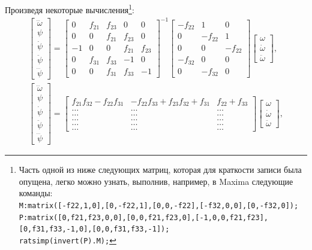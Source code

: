 \documentclass[12pt,a4paper,openany]{extarticle}
\begin{document}
Произведя некоторые вычисления\footnote{Часть одной из ниже следующих матриц, которая для краткости записи была опущена, легко можно узнать, выполнив, например, в Maxima следующие команды:\\
\texttt{M:matrix([-f22,1,0],[0,-f22,1],[0,0,-f22],[-f32,0,0],[0,-f32,0]);}\\
\texttt{P:matrix([0,f21,f23,0,0],[0,0,f21,f23,0],[-1,0,0,f21,f23],[0,f31,f33,-1,0],[0,0,f31,f33,-1]);}\\
\texttt{ratsimp(invert(P).M);}}:
\begin{gather}
\begin{bmatrix}
\dddot\omega \\ \psi \\ \dot\psi \\ \ddot\psi \\ \dddot\psi
\end{bmatrix}
=
\begin{bmatrix}
0  & f_{21} & f_{23} & 0      & 0\\
0  & 0      & f_{21} & f_{23} & 0\\
-1 & 0      & 0      & f_{21} & f_{23}\\
0  & f_{31} & f_{33} & -1     & 0\\
0  & 0      & f_{31} & f_{33} & -1
\end{bmatrix}^{-1}
\begin{bmatrix}
-f_{22} & 1       & 0\\
0       & -f_{22} & 1\\
0       & 0       & -f_{22}\\
-f_{32} & 0       & 0\\
0       & -f_{32} & 0
\end{bmatrix}
\begin{bmatrix}
\omega \\ \dot\omega \\ \ddot\omega
\end{bmatrix}\!\!,\\
%
\begin{bmatrix}
\dddot\omega \\ \psi \\ \dot\psi \\ \ddot\psi \\ \dddot\psi
\end{bmatrix}
=
\begin{bmatrix}
f_{21}f_{32}-f_{22}f_{31} & -f_{22}f_{33} + f_{23}f_{32} + f_{31} & f_{22}+f_{33}\\
\dots & \dots & \dots\\
\dots & \dots & \dots\\
\dots & \dots & \dots\\
\dots & \dots & \dots\\
\dots & \dots & \dots
\end{bmatrix}
\begin{bmatrix}
\omega \\ \dot\omega \\ \ddot\omega
\end{bmatrix}\!\!,
\end{gather}
\end{document}
